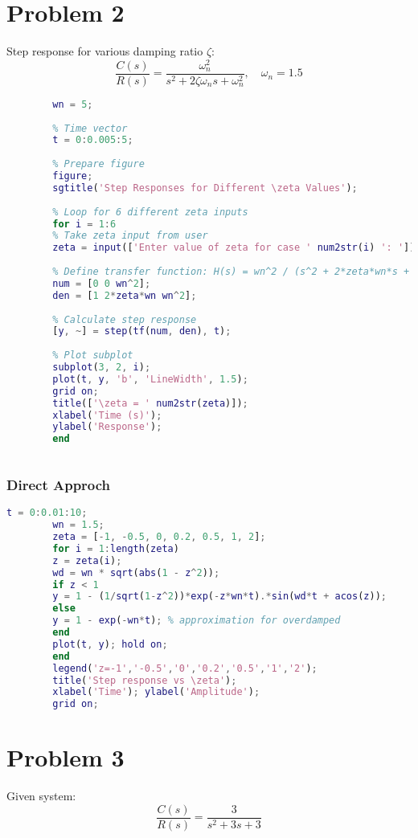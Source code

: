 \documentclass{article}
\begin{document}
	\section*{Problem 2}
	Step response for various damping ratio $\zeta$:
	\[
	\frac{C(s)}{R(s)} = \frac{\omega_n^2}{s^2 + 2\zeta\omega_n s + \omega_n^2}, \quad \omega_n = 1.5
	\]
	\begin{lstlisting}[language=Matlab, caption=Step response vs damping ratio (manual)]
		% Natural frequency (assumed constant)
		wn = 5;
		
		% Time vector
		t = 0:0.005:5;
		
		% Prepare figure
		figure;
		sgtitle('Step Responses for Different \zeta Values');
		
		% Loop for 6 different zeta inputs
		for i = 1:6
		% Take zeta input from user
		zeta = input(['Enter value of zeta for case ' num2str(i) ': ']);
		
		% Define transfer function: H(s) = wn^2 / (s^2 + 2*zeta*wn*s + wn^2)
		num = [0 0 wn^2];
		den = [1 2*zeta*wn wn^2];
		
		% Calculate step response
		[y, ~] = step(tf(num, den), t);
		
		% Plot subplot
		subplot(3, 2, i);
		plot(t, y, 'b', 'LineWidth', 1.5);
		grid on;
		title(['\zeta = ' num2str(zeta)]);
		xlabel('Time (s)');
		ylabel('Response');
		end
		
	\end{lstlisting}
	\subsubsection{Direct Approch}
	\begin{lstlisting}[language=Matlab, caption=Step response vs damping ratio (manual)]
		t = 0:0.01:10;
		wn = 1.5;
		zeta = [-1, -0.5, 0, 0.2, 0.5, 1, 2];
		for i = 1:length(zeta)
		z = zeta(i);
		wd = wn * sqrt(abs(1 - z^2));
		if z < 1
		y = 1 - (1/sqrt(1-z^2))*exp(-z*wn*t).*sin(wd*t + acos(z));
		else
		y = 1 - exp(-wn*t); % approximation for overdamped
		end
		plot(t, y); hold on;
		end
		legend('z=-1','-0.5','0','0.2','0.5','1','2');
		title('Step response vs \zeta');
		xlabel('Time'); ylabel('Amplitude');
		grid on;
	\end{lstlisting}
	
	\section*{Problem 3}
	Given system:
	\[
	\frac{C(s)}{R(s)} = \frac{3}{s^2 + 3s + 3}
	\]
	
\end{document}
